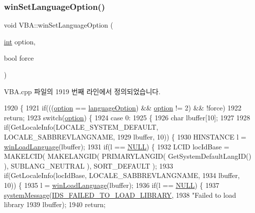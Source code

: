 \subsubsection{\texorpdfstring{win\+Set\+Language\+Option()}{winSetLanguageOption()}}
{\footnotesize\ttfamily void V\+B\+A\+::win\+Set\+Language\+Option (\begin{DoxyParamCaption}\item[{\mbox{\hyperlink{_util_8cpp_a0ef32aa8672df19503a49fab2d0c8071}{int}}}]{option,  }\item[{bool}]{force }\end{DoxyParamCaption})}



V\+B\+A.\+cpp 파일의 1919 번째 라인에서 정의되었습니다.


\begin{DoxyCode}
1920 \{
1921   \textcolor{keywordflow}{if}(((\mbox{\hyperlink{structoption}{option}} == \mbox{\hyperlink{class_v_b_a_ac747a07ec2db4bcddea1b4581ebe5c6b}{languageOption}}) && \mbox{\hyperlink{structoption}{option}} != 2) && !force)
1922     \textcolor{keywordflow}{return};
1923   \textcolor{keywordflow}{switch}(\mbox{\hyperlink{structoption}{option}}) \{
1924   \textcolor{keywordflow}{case} 0:
1925     \{
1926       \textcolor{keywordtype}{char} lbuffer[10];
1927 
1928       \textcolor{keywordflow}{if}(GetLocaleInfo(LOCALE\_SYSTEM\_DEFAULT, LOCALE\_SABBREVLANGNAME,
1929                        lbuffer, 10)) \{
1930         HINSTANCE l = \mbox{\hyperlink{class_v_b_a_abbf1f3cbda50fca40ddf50a6fafe8e05}{winLoadLanguage}}(lbuffer);
1931         \textcolor{keywordflow}{if}(l == \mbox{\hyperlink{getopt1_8c_a070d2ce7b6bb7e5c05602aa8c308d0c4}{NULL}}) \{
1932           LCID locIdBase = MAKELCID( MAKELANGID( PRIMARYLANGID( GetSystemDefaultLangID() ), SUBLANG\_NEUTRAL
       ), SORT\_DEFAULT );
1933           \textcolor{keywordflow}{if}(GetLocaleInfo(locIdBase, LOCALE\_SABBREVLANGNAME,
1934                            lbuffer, 10)) \{
1935             l = \mbox{\hyperlink{class_v_b_a_abbf1f3cbda50fca40ddf50a6fafe8e05}{winLoadLanguage}}(lbuffer);
1936             \textcolor{keywordflow}{if}(l == \mbox{\hyperlink{getopt1_8c_a070d2ce7b6bb7e5c05602aa8c308d0c4}{NULL}}) \{
1937               \mbox{\hyperlink{_v_b_a_8cpp_a2c709b1a3f26930ca4351d7516339436}{systemMessage}}(\mbox{\hyperlink{resource_8h_a3477bed37b8399c34699d02891c6a3a7}{IDS\_FAILED\_TO\_LOAD\_LIBRARY}},
1938                             \textcolor{stringliteral}{"Failed to load library %
1939                             lbuffer);
1940               \textcolor{keywordflow}{return};
}
\end{DoxyCode}

